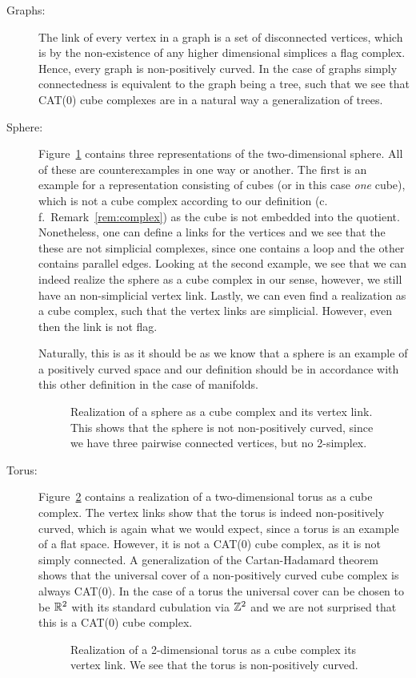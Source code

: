 \begin{bsp}
  \label{bsp:ccc}
  \begin{description}
  \item[Graphs:] The link of every vertex in a graph is a set of disconnected vertices, which is by the non-existence of any higher dimensional simplices a flag complex. Hence, every graph is non-positively curved. In the case of graphs simply connectedness is equivalent to the graph being a tree, such that we see that CAT(0) cube complexes are in a natural way a generalization of trees.
  \item[Sphere:] Figure~\ref{fig:sphere} contains three representations of the two-dimensional sphere. All of these are counterexamples in one way or another. The first is an example for a representation consisting of cubes (or in this case \emph{one} cube), which is not a cube complex according to our definition (c.\,f.\ Remark~\ref{rem:complex}) as the cube is not embedded  into the quotient. Nonetheless, one can define a links for the vertices and we see that the these are not simplicial complexes, since one contains a loop and the other contains parallel edges. Looking at the second example, we see that we can indeed realize the sphere as a cube complex in our sense, however, we still have an non-simplicial vertex link. Lastly, we can even find a realization as a cube complex, such that the vertex links are simplicial. However, even then the link is not flag.

    Naturally, this is as it should be as we know that a sphere is an example of a positively curved space and our definition should be in accordance with this other definition in the case of manifolds.
    \begin{figure}[htbp]
      \centering
      
      \caption{Realization of a sphere as a cube complex and its vertex link. This shows that the sphere is not non-positively curved, since we have three pairwise connected vertices, but no 2-simplex.}
      \label{fig:sphere}
    \end{figure}
  \item[Torus:] Figure~\ref{fig:torus} contains a realization of a two-dimensional torus as a cube complex. The vertex links show that the torus is indeed non-positively curved, which is again what we would expect, since a torus is an example of a flat space. However, it is not a CAT(0) cube complex, as it is not simply connected. A generalization of the Cartan-Hadamard theorem shows that the universal cover of a non-positively curved cube complex is always CAT(0). In the case of a torus the universal cover can be chosen to be \(\mathbb{R}^2\) with its standard cubulation via \(\mathbb{Z}^2\) and we are not surprised that this is a CAT(0) cube complex.
    \begin{figure}[htbp]
      \centering
      
      \caption{Realization of a 2-dimensional torus as a cube complex its vertex link. We see that the torus is non-positively curved.}
      \label{fig:torus}
    \end{figure}


\end{description}
\end{bsp}
